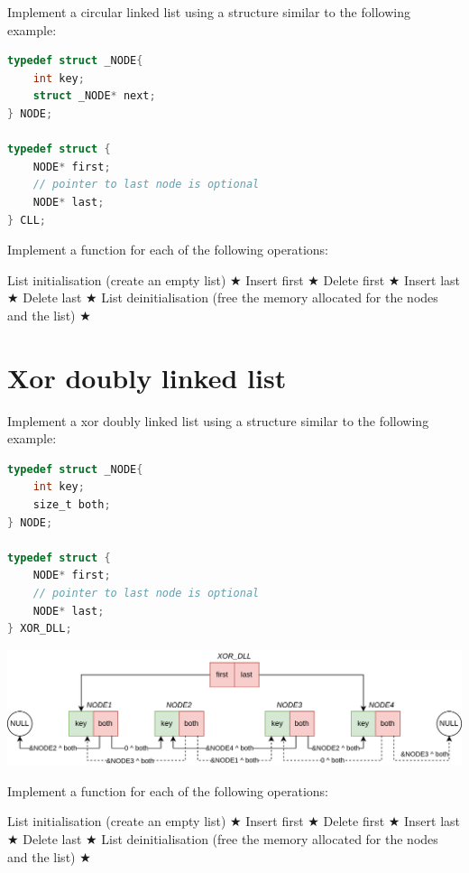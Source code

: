 \documentclass{exam}
\newcommand\lvlez{$\bigstar$}
\begin{document}
\noindent Implement a circular linked list using a structure similar to the following example:

\begin{lstlisting}[language=C]
typedef struct _NODE{
    int key;
    struct _NODE* next;
} NODE;

typedef struct {
    NODE* first;
    // pointer to last node is optional
    NODE* last;
} CLL;
\end{lstlisting}


\bigskip
\noindent Implement a function for each of the following operations:
\begin{questions}
\question List initialisation (create an empty list) \lvlez
\question Insert first \lvlez
\question Delete first \lvlez
\question Insert last \lvlez
\question Delete last \lvlez
\question List deinitialisation (free the memory allocated for the nodes and the list) \lvlez
\end{questions}

\section{Xor doubly linked list}

\noindent Implement a xor doubly linked list using a structure similar to the following example:
\bigskip
\begin{lstlisting}[language=C]
typedef struct _NODE{
    int key;
    size_t both;
} NODE;

typedef struct {
    NODE* first;
    // pointer to last node is optional
    NODE* last;
} XOR_DLL;
\end{lstlisting}

\begin{center}
\includegraphics[width=\textwidth]{diagrams/xordll.png}
\end{center}

\bigskip
\noindent Implement a function for each of the following operations:
\begin{questions}
\question List initialisation (create an empty list) \lvlez
\question Insert first \lvlez
\question Delete first \lvlez
\question Insert last \lvlez
\question Delete last \lvlez
\question List deinitialisation (free the memory allocated for the nodes and the list) \lvlez
\end{questions}
\end{document}
